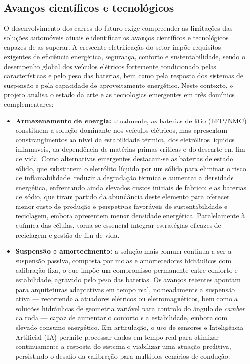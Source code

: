\subsection{Avanços científicos e tecnológicos}
\begin{campotexto}
O desenvolvimento dos carros do futuro exige compreender as limitações das soluções automóveis atuais e identificar os avanços científicos e tecnológicos capazes de as superar. A crescente eletrificação do setor impõe requisitos exigentes de eficiência energética, segurança, conforto e sustentabilidade, sendo o desempenho global dos veículos elétricos fortemente condicionado pelas características e pelo peso das baterias, bem como pela resposta dos sistemas de suspensão e pela capacidade de aproveitamento energético. Neste contexto, o projeto analisa o estado da arte e as tecnologias emergentes em três domínios complementares:
\begin{itemize}
    \item \textbf{Armazenamento de energia:} atualmente, as baterias de lítio (LFP/NMC) constituem a solução dominante nos veículos elétricos, mas apresentam constrangimentos ao nível da estabilidade térmica, dos eletrólitos líquidos inflamáveis, da dependência de matérias-primas críticas e do descarte em fim de vida. Como alternativas emergentes destacam-se as baterias de estado sólido, que substituem o eletrólito líquido por um sólido para eliminar o risco de inflamabilidade, reduzir a degradação térmica e aumentar a densidade energética, enfrentando ainda elevados custos iniciais de fabrico; e as baterias de sódio, que tiram partido da abundância deste elemento para oferecer menor custo de produção e perspetivas favoráveis de sustentabilidade e reciclagem, embora apresentem menor densidade energética. Paralelamente à química das células, torna-se essencial integrar estratégias eficazes de reciclagem e gestão de fim de vida.
    \item \textbf{Suspensão e amortecimento:} a solução mais comum continua a ser a suspensão passiva, composta por molas e amortecedores hidráulicos com calibração fixa, o que impõe um compromisso permanente entre conforto e estabilidade, agravado pelo peso das baterias. Os avanços recentes apontam para arquiteturas adaptativas em tempo real, nomeadamente a suspensão ativa --- recorrendo a atuadores elétricos ou eletromagnéticos, bem como a soluções hidráulicas de geometria variável para controlo do ângulo de \textit{camber} da roda --- capaz de aumentar o conforto e a estabilidade, embora com elevado consumo energético. Em articulação, o uso de sensores e Inteligência Artificial (IA) permite processar dados em tempo real para otimizar continuamente a resposta do sistema e viabilizar uma atuação preditiva, persistindo o desafio da calibração para múltiplos cenários de condução.

\end{itemize}
\end{campotexto}
